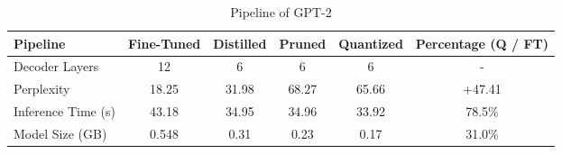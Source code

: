 \begin{table*}[h!]
    \centering
    \begin{tabular}{lccccc}
        \toprule
        \textbf{Pipeline}       & \textbf{Fine-Tuned} & \textbf{Distilled} & \textbf{Pruned} & \textbf{Quantized}  & \textbf{Percentage (Q / FT)} \\ \midrule
        Decoder Layers        & 12                  & 6                     & 6                & 6  &  -                    \\
        Perplexity      & 18.25               & 31.98                 & 68.27            & 65.66  &  +47.41                 \\
        Inference Time (s)    & 43.18               & 34.95                 & 34.96             & 33.92  &  78.5\%                  \\
        Model Size (GB)       & 0.548                & 0.31                  & 0.23             & 0.17   &  31.0\%                  \\ \bottomrule
    \end{tabular}
    \caption{Pipeline of GPT-2}
    \label{tab:GPT2_pipeline}
\end{table*}